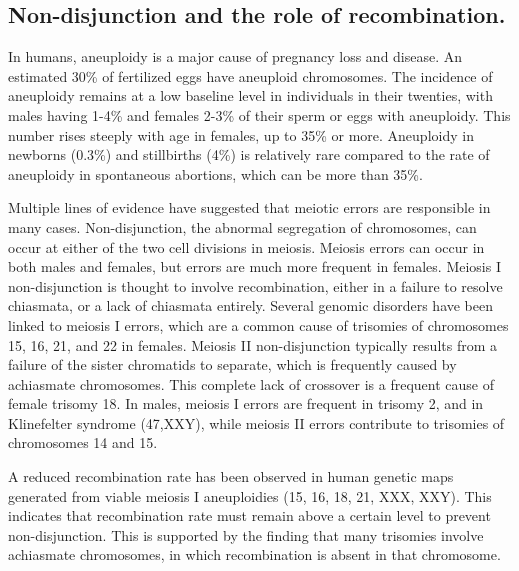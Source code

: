 \subsection{Non-disjunction and the role of recombination.}

In humans, aneuploidy is a major cause of pregnancy loss and disease.
An estimated 30\% of fertilized eggs have aneuploid chromosomes\cite{Hassold2001}.
The incidence of aneuploidy remains at a low baseline level in individuals in their twenties, with males having 1-4\% and females 2-3\% of their sperm or eggs with aneuploidy\cite{Hassold2009,Nagaoka2012}.
This number rises steeply with age in females, up to 35\% or more\cite{Nagaoka2012}.
Aneuploidy in newborns (0.3\%) and stillbirths (4\%) is relatively rare compared to the rate of aneuploidy in spontaneous abortions, which can be more than 35\%\cite{Nagaoka2012}.

Multiple lines of evidence have suggested that meiotic errors are responsible in many cases.
Non-disjunction, the abnormal segregation of chromosomes, can occur at either of the two cell divisions in meiosis.
Meiosis errors can occur in both males and females, but errors are much more frequent in females\cite{Hassold2001,Nagaoka2012}.
Meiosis I non-disjunction is thought to involve recombination, either in a failure to resolve chiasmata, or a lack of chiasmata entirely.
Several genomic disorders have been linked to meiosis I errors, which are a common cause of trisomies of chromosomes 15, 16, 21, and 22 in females\cite{Nagaoka2012,Hassold2001}.
Meiosis II non-disjunction typically results from a failure of the sister chromatids to separate, which is frequently caused by achiasmate chromosomes.
This complete lack of crossover is a frequent cause of female trisomy 18\cite{Nagaoka2012}.
In males, meiosis I errors are frequent in trisomy 2, and in Klinefelter syndrome (47,XXY), while meiosis II errors contribute to trisomies of chromosomes 14 and 15\cite{Hassold2007}.


A reduced recombination rate has been observed in human genetic maps generated from viable meiosis I aneuploidies (15, 16, 18, 21, XXX, XXY)\cite{Hassold2001,Lynn2004}.
This indicates that recombination rate must remain above a certain level to prevent non-disjunction.
This is supported by the finding that many trisomies involve achiasmate chromosomes, in which recombination is absent in that chromosome\cite{Nagaoka2012}.

